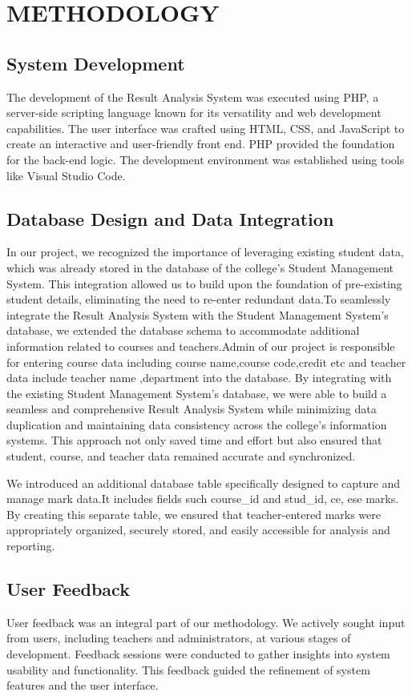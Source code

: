 \documentclass{nascproject}
\begin{document}
\chapter{METHODOLOGY}
\section{System Development}
The development of the Result Analysis System was executed using PHP, a server-side scripting language known for its versatility and web development capabilities. The user interface was crafted using HTML, CSS, and JavaScript to create an interactive and user-friendly front end. PHP provided the foundation for the back-end logic. The development environment was established using tools like Visual Studio Code.

\section{Database Design and Data Integration}
In our project, we recognized the importance of leveraging existing student data, which was already stored in the database of the college's Student Management System. This integration allowed us to build upon the foundation of pre-existing student details, eliminating the need to re-enter redundant data.To seamlessly integrate the Result Analysis System with the Student Management System's database, we extended the database schema to accommodate additional information related to courses and teachers.Admin of our project is responsible for entering course data including course name,course code,credit etc and teacher data include teacher name ,department into the database. By integrating with the existing Student Management System's database, we were able to build a seamless and comprehensive Result Analysis System while minimizing data duplication and maintaining data consistency across the college's information systems. This approach not only saved time and effort but also ensured that student, course, and teacher data remained accurate and synchronized.

We introduced an additional database table specifically designed to capture and manage mark data.It includes fields such course{\_}id and stud{\_}id, ce, ese marks. By creating this separate table, we ensured that teacher-entered marks were appropriately organized, securely stored, and easily accessible for analysis and reporting.
\section{User Feedback}
User feedback was an integral part of our methodology. We actively sought input from users, including teachers and administrators, at various stages of development. Feedback sessions were conducted to gather insights into system usability and functionality. This feedback guided the refinement of system features and the user interface.
\end{document}
